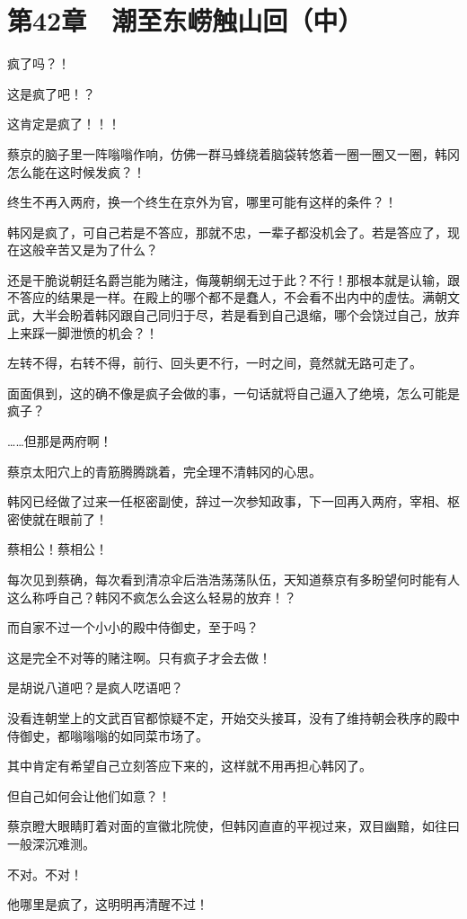 \section{第42章　潮至东崂触山回（中）}

疯了吗？！

这是疯了吧！？

这肯定是疯了！！！

蔡京的脑子里一阵嗡嗡作响，仿佛一群马蜂绕着脑袋转悠着一圈一圈又一圈，韩冈怎么能在这时候发疯？！

终生不再入两府，换一个终生在京外为官，哪里可能有这样的条件？！

韩冈是疯了，可自己若是不答应，那就不忠，一辈子都没机会了。若是答应了，现在这般辛苦又是为了什么？

还是干脆说朝廷名爵岂能为赌注，侮蔑朝纲无过于此？不行！那根本就是认输，跟不答应的结果是一样。在殿上的哪个都不是蠢人，不会看不出内中的虚怯。满朝文武，大半会盼着韩冈跟自己同归于尽，若是看到自己退缩，哪个会饶过自己，放弃上来踩一脚泄愤的机会？！

左转不得，右转不得，前行、回头更不行，一时之间，竟然就无路可走了。

面面俱到，这的确不像是疯子会做的事，一句话就将自己逼入了绝境，怎么可能是疯子？

……但那是两府啊！

蔡京太阳穴上的青筋腾腾跳着，完全理不清韩冈的心思。

韩冈已经做了过来一任枢密副使，辞过一次参知政事，下一回再入两府，宰相、枢密使就在眼前了！

蔡相公！蔡相公！

每次见到蔡确，每次看到清凉伞后浩浩荡荡队伍，天知道蔡京有多盼望何时能有人这么称呼自己？韩冈不疯怎么会这么轻易的放弃！？

而自家不过一个小小的殿中侍御史，至于吗？

这是完全不对等的赌注啊。只有疯子才会去做！

是胡说八道吧？是疯人呓语吧？

没看连朝堂上的文武百官都惊疑不定，开始交头接耳，没有了维持朝会秩序的殿中侍御史，都嗡嗡嗡的如同菜市场了。

其中肯定有希望自己立刻答应下来的，这样就不用再担心韩冈了。

但自己如何会让他们如意？！

蔡京瞪大眼睛盯着对面的宣徽北院使，但韩冈直直的平视过来，双目幽黯，如往曰一般深沉难测。

不对。不对！

他哪里是疯了，这明明再清醒不过！

